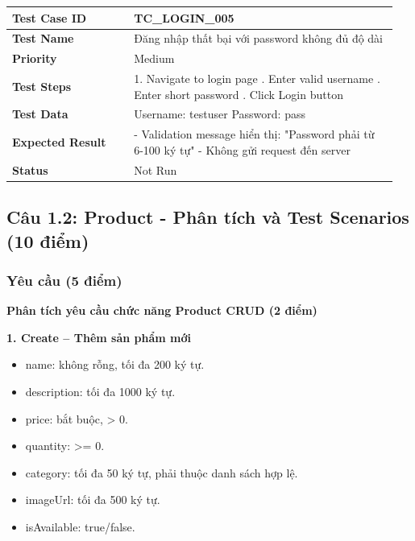\documentclass[a4paper,12pt]{article}
\begin{document}
\begin{longtable}{|p{0.3\linewidth}|p{0.65\linewidth}|}
\hline
\textbf{Test Case ID} & TC\_LOGIN\_005 \\ \hline
\textbf{Test Name} & Đăng nhập thất bại với password không đủ độ dài \\ \hline
\textbf{Priority} & Medium \\ \hline
\textbf{Test Steps} & 1. Navigate to login page \newline 2. Enter valid username \newline 3. Enter short password \newline 4. Click Login button \\ \hline
\textbf{Test Data} & Username: testuser \newline Password: pass \\ \hline
\textbf{Expected Result} & - Validation message hiển thị: "Password phải từ 6-100 ký tự" \newline - Không gửi request đến server \\ \hline
\textbf{Status} & Not Run \\ \hline
\end{longtable}

\subsection{Câu 1.2: Product - Phân tích và Test Scenarios (10 điểm)}

\subsubsection{Yêu cầu (5 điểm)}
\textbf{Phân tích yêu cầu chức năng Product CRUD (2 điểm)}

\textbf{1. Create -- Thêm sản phẩm mới}
\begin{itemize}
    \item name: không rỗng, tối đa 200 ký tự.
    \item description: tối đa 1000 ký tự.
    \item price: bắt buộc, \textgreater{} 0.
    \item quantity: \textgreater{}= 0.
    \item category: tối đa 50 ký tự, phải thuộc danh sách hợp lệ.
    \item imageUrl: tối đa 500 ký tự.
    \item isAvailable: true/false.
\end{itemize}
\end{document}
